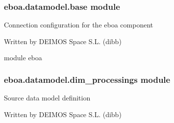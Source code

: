 \begin{fulllineitems}

\begin{fulllineitems}
\label{\detokenize{eboa.datamodel:eboa.datamodel.annotations.AnnotationTimestamp.parent_level}}
\end{fulllineitems}


\begin{fulllineitems}
\label{\detokenize{eboa.datamodel:eboa.datamodel.annotations.AnnotationTimestamp.parent_position}}
\end{fulllineitems}


\begin{fulllineitems}
\label{\detokenize{eboa.datamodel:eboa.datamodel.annotations.AnnotationTimestamp.value}}
\end{fulllineitems}


\end{fulllineitems}



\subsubsection{eboa.datamodel.base module}
\label{\detokenize{eboa.datamodel:module-eboa.datamodel.base}}\label{\detokenize{eboa.datamodel:eboa-datamodel-base-module}}
Connection configuration for the eboa component

Written by DEIMOS Space S.L. (dibb)

module eboa


\subsubsection{eboa.datamodel.dim\_processings module}
\label{\detokenize{eboa.datamodel:module-eboa.datamodel.sources}}\label{\detokenize{eboa.datamodel:eboa-datamodel-dim-processings-module}}
Source data model definition

Written by DEIMOS Space S.L. (dibb)

